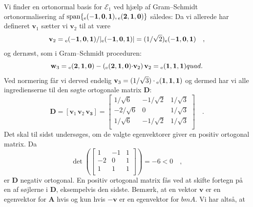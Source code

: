 \begin{example}
Vi finder en ortonormal basis for $\mathcal{E}_{1}$ ved hjælp af Gram--Schmidt ortonormalisering af $\mathrm{span}\{ {_\mathrm{e}\mathbf{(-1,0,1)}},  {_\mathrm{e}\mathbf{(2,1,0)}}\}$ således:
Da vi allerede har defineret $\mathbf{v}_{1}$ sætter vi $\mathbf{v}_{2}$ til at være
\begin{equation}
\mathbf{v}_{2} = {_\mathrm{e}\mathbf{(-1,0,1)}}/\vert {_\mathrm{e}\mathbf{(-1, 0,1)}} \vert = (1/\sqrt{2}){_\mathrm{e}\mathbf{(-1,0,1)}} \quad ,
\end{equation}
og dernæst, som i Gram--Schmidt proceduren:
\begin{equation}
\mathbf{w}_{3} = {_\mathrm{e}\mathbf{(2,1,0)}} - \left({_\mathrm{e}\mathbf{(2,1,0)}}\mathbf{\cdot}\mathbf{v}_{2}\right)\mathbf{v}_{2} = {_\mathrm{e}\mathbf{(1,1,1)}} quad .
\end{equation}
Ved normering får vi derved endelig $\mathbf{v}_{3} = (1/\sqrt{3})\cdot{_\mathrm{e}\mathbf{(1,1,1)}}$ og dermed har vi alle ingredienserne til den søgte ortogonale matrix $\mathbf{D}$:
\begin{equation}
\mathbf{D} = [ \mathbf{v}_{1} \, \mathbf{v}_{2} \, \mathbf{{v}_{3}} ] = \left[
                                                            \begin{array}{rrr}
                                                              1/\sqrt{6} & -1/\sqrt{2} & 1/\sqrt{3} \\
                                                              -2/\sqrt{6} & 0 &1/\sqrt{3} \\
                                                              1/\sqrt{6} & -1/\sqrt{2} & 1/\sqrt{3} \\
                                                            \end{array}
                                                          \right] \quad .
\end{equation}
Det skal til sidst undersøges, om de valgte egenvektorer giver en positiv ortogonal matrix. Da
\begin{equation}
\det\left( \left[
             \begin{array}{ccc}
               1 & -1 & 1 \\
               -2 & 0 & 1 \\
               1 & 1 & 1 \\
             \end{array}
           \right] \right) = -6 < 0 \quad,
\end{equation}
er $\mathbf{D}$ negativ ortogonal. En positiv ortogonal matrix fås ved at skifte fortegn på en af søjlerne i $\mathbf{D}$, eksempelvis den sidste. Bemærk, at en vektor $\bm{v}$ er en egenvektor for $\bm{A}$ hvis og kun hvis $-\bm{v}$ er en egenvektor for $bm{A}$. Vi har altså, at 

\end{example}
